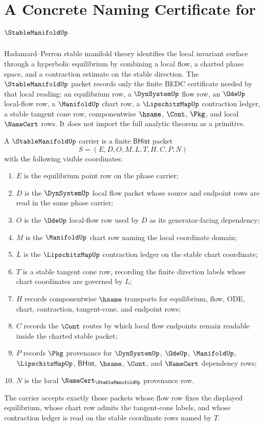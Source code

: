 \chapter{A Concrete Naming Certificate for $\StableManifoldUp$}
\label{ch:concrete-instances-stablemanifold-namecert}

Hadamard--Perron stable manifold theory identifies the local invariant
surface through a hyperbolic equilibrium by combining a local flow, a charted
phase space, and a contraction estimate on the stable direction. The
$\StableManifoldUp$ packet records only the finite BEDC certificate needed by
that local reading: an equilibrium row, a $\DynSystemUp$ flow row, an
$\OdeUp$ local-flow row, a $\ManifoldUp$ chart row, a
$\LipschitzMapUp$ contraction ledger, a stable tangent cone row, componentwise
$\hsame$, $\Cont$, $\Pkg$, and local $\NameCert$ rows. It does not import the
full analytic theorem as a primitive.

\begin{definition}
\label{def:stable-manifold-carrier}
A $\StableManifoldUp$ carrier is a finite $\mathsf{BHist}$ packet
$$
S=(E,D,O,M,L,T,H,C,P,N)
$$
with the following visible coordinates:
\begin{enumerate}
\item $E$ is the equilibrium point row on the phase carrier;
\item $D$ is the $\DynSystemUp$ local flow packet whose source and endpoint
rows are read in the same phase carrier;
\item $O$ is the $\OdeUp$ local-flow row used by $D$ as its generator-facing
dependency;
\item $M$ is the $\ManifoldUp$ chart row naming the local coordinate domain;
\item $L$ is the $\LipschitzMapUp$ contraction ledger on the stable chart
coordinate;
\item $T$ is a stable tangent cone row, recording the finite direction labels
whose chart coordinates are governed by $L$;
\item $H$ records componentwise $\hsame$ transports for equilibrium, flow,
ODE, chart, contraction, tangent-cone, and endpoint rows;
\item $C$ records the $\Cont$ routes by which local flow endpoints remain
readable inside the charted stable packet;
\item $P$ records $\Pkg$ provenance for $\DynSystemUp$, $\OdeUp$,
$\ManifoldUp$, $\LipschitzMapUp$, $\mathsf{BHist}$, $\hsame$, $\Cont$, and
$\NameCert$ dependency rows;
\item $N$ is the local $\NameCert_{\StableManifoldUp}$ provenance row.
\end{enumerate}
The carrier accepts exactly those packets whose flow row fixes the displayed
equilibrium, whose chart row admits the tangent-cone labels, and whose
contraction ledger is read on the stable coordinate rows named by $T$.
\end{definition}

